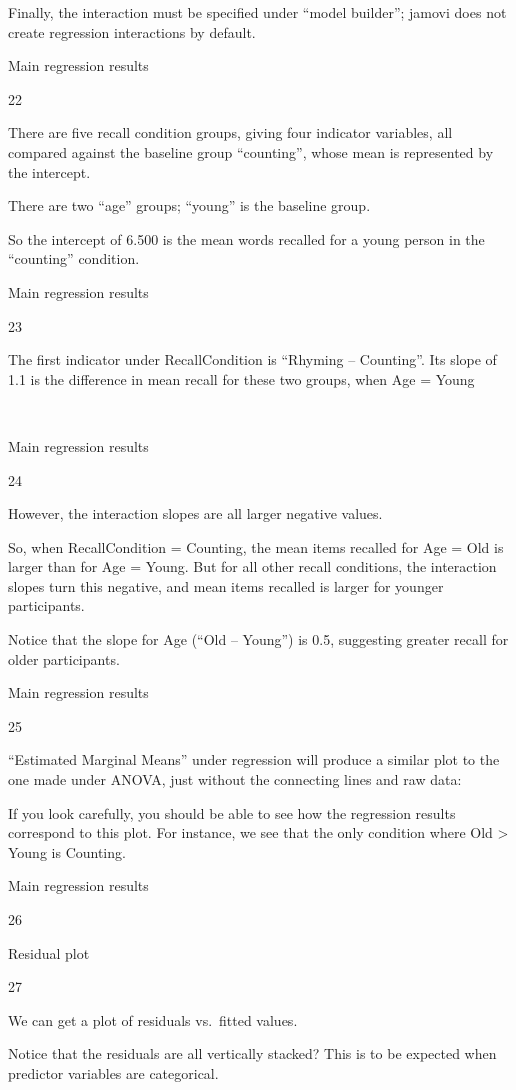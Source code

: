 \documentclass[
  letterpaper,
  DIV=11,
  numbers=noendperiod]{scrreprt}
\begin{document}
Finally, the interaction must be specified under ``model builder'';
jamovi does not create regression interactions by default.

Main regression results

22

There are five recall condition groups, giving four indicator variables,
all compared against the baseline group ``counting'', whose mean is
represented by the intercept.

There are two ``age'' groups; ``young'' is the baseline group. 

So the intercept of 6.500 is the mean words recalled for a young person
in the ``counting'' condition.

Main regression results

23

The first indicator under RecallCondition is ``Rhyming -- Counting''.
Its slope of 1.1 is the difference in mean recall for these two groups,
when Age = Young

~

Main regression results

24

However, the interaction slopes are all larger negative values.

So, when RecallCondition = Counting, the mean items recalled for Age =
Old is larger than for Age = Young. But for all other recall conditions,
the interaction slopes turn this negative, and mean items recalled is
larger for younger participants.

Notice that the slope for Age (``Old -- Young'') is 0.5, suggesting
greater recall for older participants.

Main regression results

25

``Estimated Marginal Means'' under regression will produce a similar
plot to the one made under ANOVA, just without the connecting lines and
raw data:

If you look carefully, you should be able to see how the regression
results correspond to this plot. For instance, we see that the only
condition where Old \textgreater{} Young is Counting.

Main regression results

26

Residual plot

27

We can get a plot of residuals vs.~fitted values.

Notice that the residuals are all vertically stacked? This is to be
expected when predictor variables are categorical.
\end{document}
